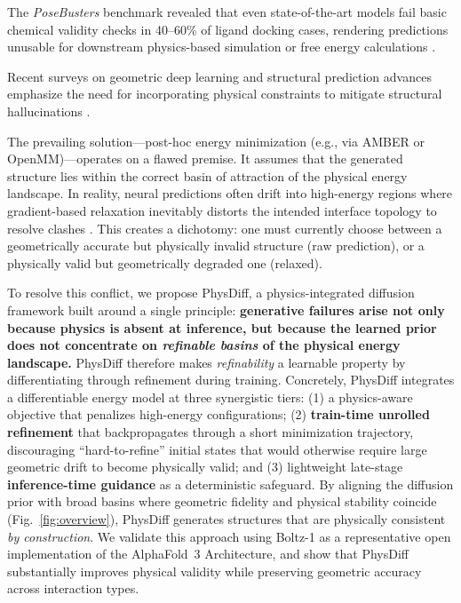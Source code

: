 \documentclass[twocolumn,10pt]{article}
\newcommand{\modelname}{PhysDiff}
\newcommand{\OpenBaseline}{Boltz-1}
\newcommand{\AFthreeArch}{AlphaFold~3 Architecture}
\begin{document}
The \textit{PoseBusters} benchmark revealed that even state-of-the-art models fail basic chemical validity checks in 40--60\% of ligand docking cases, rendering predictions unusable for downstream physics-based simulation or free energy calculations \cite{buttenschoen2024posebusters,corso2024deep}. 

Recent surveys on geometric deep learning \cite{alhuwaider2024survey} and structural prediction advances \cite{ovchinnikov2021advances,eisenberg2024structure} emphasize the need for incorporating physical constraints to mitigate structural hallucinations \cite{wong2024structural}. 

The prevailing solution---post-hoc energy minimization (e.g., via AMBER or OpenMM)---operates on a flawed premise. It assumes that the generated structure lies within the correct basin of attraction of the physical energy landscape. In reality, neural predictions often drift into high-energy regions where gradient-based relaxation inevitably distorts the intended interface topology to resolve clashes \cite{watson2023novo}. This creates a dichotomy: one must currently choose between a geometrically accurate but physically invalid structure (raw prediction), or a physically valid but geometrically degraded one (relaxed).

To resolve this conflict, we propose \modelname{}, a physics-integrated diffusion framework built around a single principle:
\textbf{generative failures arise not only because physics is absent at inference, but because the learned prior does not concentrate on \emph{refinable basins} of the physical energy landscape.}
\modelname{} therefore makes \emph{refinability} a learnable property by differentiating through refinement during training.
Concretely, \modelname{} integrates a differentiable energy model at three synergistic tiers:
(1) a physics-aware objective that penalizes high-energy configurations;
(2) \textbf{train-time unrolled refinement} that backpropagates through a short minimization trajectory, discouraging ``hard-to-refine'' initial states that would otherwise require large geometric drift to become physically valid;
and (3) lightweight late-stage \textbf{inference-time guidance} as a deterministic safeguard.
By aligning the diffusion prior with broad basins where geometric fidelity and physical stability coincide (Fig.~\ref{fig:overview}), \modelname{} generates structures that are physically consistent \emph{by construction}.
We validate this approach using \OpenBaseline{} as a representative open implementation of the \AFthreeArch{}, and show that \modelname{} substantially improves physical validity while preserving geometric accuracy across interaction types.
\end{document}
